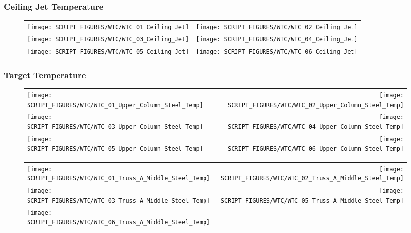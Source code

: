 \clearpage

\subsubsection{Ceiling Jet Temperature}

\begin{figure}[p]
\begin{tabular*}{\textwidth}{l@{\extracolsep{\fill}}r}
\texttt{[image: SCRIPT\_FIGURES/WTC/WTC\_01\_Ceiling\_Jet]} &
\texttt{[image: SCRIPT\_FIGURES/WTC/WTC\_02\_Ceiling\_Jet]} \\
\texttt{[image: SCRIPT\_FIGURES/WTC/WTC\_03\_Ceiling\_Jet]} &
\texttt{[image: SCRIPT\_FIGURES/WTC/WTC\_04\_Ceiling\_Jet]} \\
\texttt{[image: SCRIPT\_FIGURES/WTC/WTC\_05\_Ceiling\_Jet]} &
\texttt{[image: SCRIPT\_FIGURES/WTC/WTC\_06\_Ceiling\_Jet]}
\end{tabular*}
\end{figure}

\clearpage

\subsubsection{Target Temperature}

\begin{figure}[p]
\begin{tabular*}{\textwidth}{l@{\extracolsep{\fill}}r}
\texttt{[image: SCRIPT\_FIGURES/WTC/WTC\_01\_Upper\_Column\_Steel\_Temp]} &
\texttt{[image: SCRIPT\_FIGURES/WTC/WTC\_02\_Upper\_Column\_Steel\_Temp]} \\
\texttt{[image: SCRIPT\_FIGURES/WTC/WTC\_03\_Upper\_Column\_Steel\_Temp]} &
\texttt{[image: SCRIPT\_FIGURES/WTC/WTC\_04\_Upper\_Column\_Steel\_Temp]} \\
\texttt{[image: SCRIPT\_FIGURES/WTC/WTC\_05\_Upper\_Column\_Steel\_Temp]} &
\texttt{[image: SCRIPT\_FIGURES/WTC/WTC\_06\_Upper\_Column\_Steel\_Temp]}
\end{tabular*}
\end{figure}

\begin{figure}[p]
\begin{tabular*}{\textwidth}{l@{\extracolsep{\fill}}r}
\texttt{[image: SCRIPT\_FIGURES/WTC/WTC\_01\_Truss\_A\_Middle\_Steel\_Temp]} &
\texttt{[image: SCRIPT\_FIGURES/WTC/WTC\_02\_Truss\_A\_Middle\_Steel\_Temp]} \\
\texttt{[image: SCRIPT\_FIGURES/WTC/WTC\_03\_Truss\_A\_Middle\_Steel\_Temp]} &
\texttt{[image: SCRIPT\_FIGURES/WTC/WTC\_05\_Truss\_A\_Middle\_Steel\_Temp]} \\
\texttt{[image: SCRIPT\_FIGURES/WTC/WTC\_06\_Truss\_A\_Middle\_Steel\_Temp]}
\end{tabular*}
\end{figure}


